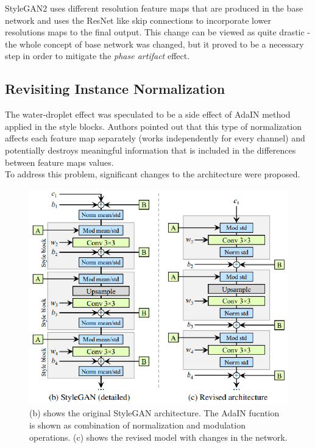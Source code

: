 \documentclass[12pt,a4paper,openany]{book}
\begin{document}
\noindent StyleGAN2 uses different resolution feature maps that are produced in the base network and uses the ResNet like skip connections to incorporate lower resolutions maps to the final output. This change can be viewed as quite drastic - the whole concept of base network was changed, but it proved to be a necessary step in order to mitigate the \textit{phase artifact} effect.

\subsection{Revisiting Instance Normalization}

\noindent The water-droplet effect was speculated to be a side effect of AdaIN method applied in the style blocks. Authors pointed out that this type of normalization affects each feature map separately (works independently for every channel) and potentially destroys meaningful information that is included in the differences between feature maps values. \\

\noindent To address this problem, significant changes to the architecture were proposed.

\begin{figure}[ht!]
    \centering
    \includegraphics[scale=1.3]{figs/changed-normalization.eps}
    \caption{(b) shows the original StyleGAN architecture. The AdaIN fucntion is shown as combination of normalization and modulation operations. (c) shows the revised model with changes in the network. \cite{stylegan2}}\label{Fig:STYLEGAN}
\end{figure}
\end{document}
